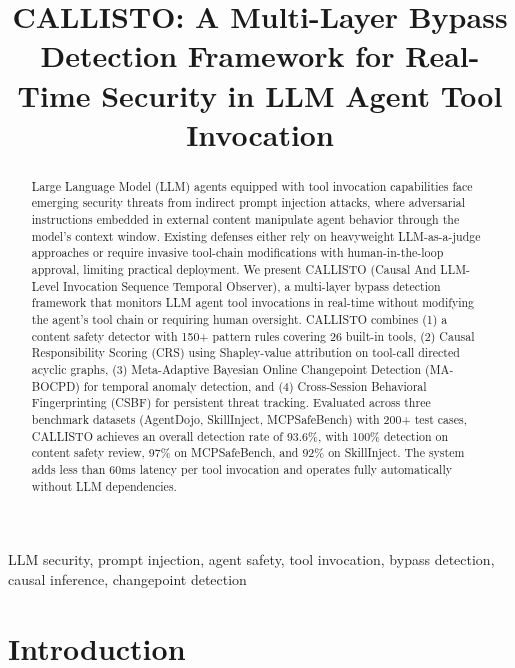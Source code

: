 \documentclass[10pt,conference]{IEEEtran}
\begin{document}
\title{CALLISTO: A Multi-Layer Bypass Detection Framework for Real-Time Security in LLM Agent Tool Invocation}

\author{
}

\maketitle

\begin{abstract}
Large Language Model (LLM) agents equipped with tool invocation capabilities face emerging security threats from indirect prompt injection attacks, where adversarial instructions embedded in external content manipulate agent behavior through the model's context window. Existing defenses either rely on heavyweight LLM-as-a-judge approaches or require invasive tool-chain modifications with human-in-the-loop approval, limiting practical deployment. We present CALLISTO (Causal And LLM-Level Invocation Sequence Temporal Observer), a multi-layer bypass detection framework that monitors LLM agent tool invocations in real-time without modifying the agent's tool chain or requiring human oversight. CALLISTO combines (1) a content safety detector with 150+ pattern rules covering 26 built-in tools, (2) Causal Responsibility Scoring (CRS) using Shapley-value attribution on tool-call directed acyclic graphs, (3) Meta-Adaptive Bayesian Online Changepoint Detection (MA-BOCPD) for temporal anomaly detection, and (4) Cross-Session Behavioral Fingerprinting (CSBF) for persistent threat tracking. Evaluated across three benchmark datasets (AgentDojo, SkillInject, MCPSafeBench) with 200+ test cases, CALLISTO achieves an overall detection rate of 93.6\%, with 100\% detection on content safety review, 97\% on MCPSafeBench, and 92\% on SkillInject. The system adds less than 60ms latency per tool invocation and operates fully automatically without LLM dependencies.
\end{abstract}

\begin{IEEEkeywords}
LLM security, prompt injection, agent safety, tool invocation, bypass detection, causal inference, changepoint detection
\end{IEEEkeywords}

\section{Introduction}
\end{document}
